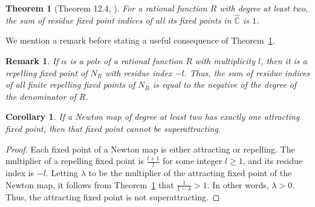 \documentclass[12pt]{article}
\newtheorem{thm}{Theorem}[section]
\newtheorem{cor}{Corollary}[section]
\newtheorem{rem}{Remark}[section]
\numberwithin{equation}{section}
\begin{document}
\begin{thm}[Theorem 12.4, \cite{Milnor_book}]
    For a rational function $R$ with degree at least two, the sum of residue fixed point indices of all its fixed points in $\widehat{\mathbb{C}}$ is $1$.
    \label{rational-fixedpoint-theorem}
\end{thm}

We mention a remark before stating a useful consequence of Theorem~\ref{rational-fixedpoint-theorem}.
\begin{rem}
	If $\alpha$ is a pole of a rational function $R$ with multiplicity $l$, then it is a repelling fixed point of $N_R$ with residue index $-l$. Thus, the sum of residue indices of all finite repelling fixed points of $N_R$ is equal to the negative of the degree of the denominator of $R$.
\end{rem}
\begin{cor}\label{ext_one_attr}
    If a Newton map of degree at least two has exactly one attracting fixed point, then that fixed point cannot be superattracting.
\end{cor}
\begin{proof}
	Each fixed point of a Newton map is either attracting or repelling. The multiplier of a repelling fixed point is $\frac{l +1}{l}$ for some integer $l  \geq 1$, and  its residue index is $-l$.
	Letting $\lambda$ to be the multiplier of the attracting fixed point of the Newton map, it follows from Theorem~\ref{rational-fixedpoint-theorem} that $\frac{1}{1-\lambda} >1$. In other words, $\lambda>0$. Thus, the attracting fixed point is not superattracting. 
\end{proof}
\end{document}
